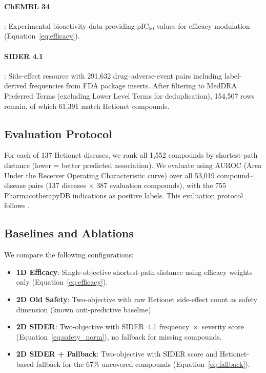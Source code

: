 \documentclass[11pt,a4paper]{article}
\begin{document}
\paragraph{ChEMBL 34} \citep{gaulton2017chembl}: Experimental
bioactivity data providing pIC$_{50}$ values for efficacy modulation
(Equation~\ref{eq:efficacy}).

\paragraph{SIDER 4.1} \citep{kuhn2016sider}: Side-effect resource with
291,632 drug--adverse-event pairs including label-derived frequencies
from FDA package inserts. After filtering to MedDRA Preferred Terms
(excluding Lower Level Terms for deduplication), 154,507 rows remain,
of which 61,391 match Hetionet compounds.

\subsection{Evaluation Protocol}
\label{sec:setup:eval}

For each of 137 Hetionet diseases, we rank all 1,552 compounds by
shortest-path distance (lower = better predicted association).
We evaluate using AUROC (Area Under the Receiver Operating
Characteristic curve) over all 53,019 compound--disease pairs
(137 diseases $\times$ 387 evaluation compounds), with the 755
PharmacotherapyDB indications as positive labels. This evaluation
protocol follows \citet{himmelstein2017systematic}.

\subsection{Baselines and Ablations}
\label{sec:setup:baselines}

We compare the following configurations:

\begin{itemize}
    \item \textbf{1D Efficacy}: Single-objective shortest-path distance
    using efficacy weights only (Equation~\ref{eq:efficacy}).

    \item \textbf{2D Old Safety}: Two-objective with raw Hetionet
    side-effect count as safety dimension (known anti-predictive
    baseline).

    \item \textbf{2D SIDER}: Two-objective with SIDER~4.1
    frequency~$\times$~severity score (Equation~\ref{eq:safety_norm}),
    no fallback for missing compounds.

    \item \textbf{2D SIDER + Fallback}: Two-objective with SIDER score
    and Hetionet-based fallback for the 67\% uncovered compounds
    (Equation~\ref{eq:fallback}).
\end{itemize}
\end{document}
